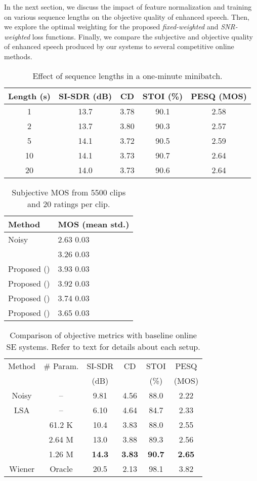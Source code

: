 \documentclass{article}
\begin{document}
In the next section, we discuss the impact of feature normalization and training on various sequence lengths on the objective quality of enhanced speech. Then, we explore the optimal weighting for the proposed \textit{fixed-weighted} and \textit{SNR-weighted} loss functions. Finally, we compare the subjective and objective quality of enhanced speech produced by our systems to several competitive online methods.
\begin{table}[tb]
  \centering
  \caption{Effect of sequence lengths in a one-minute minibatch.}
  \label{tab:seqlen}
  \begin{tabular}{c|c|c|c|c}
    Length (s) &SI-SDR (dB)&CD&STOI (\%)&PESQ (MOS)\\
    \hline
    
    1&13.7&3.78&90.1&2.58 \\
    2&13.7&3.80&90.3&2.57 \\
5&14.1&3.72&90.5&2.59 \\
10&14.1&3.73&90.7&2.64 \\
20&14.0&3.73&90.6&2.64 \\
  \end{tabular}
  \vspace{-4mm}
\end{table}
\begin{table}[tb]
  \centering
  \caption{Subjective MOS from 5500 clips and 20 ratings per clip.}
  \label{tab:sub}
  \begin{tabular}{l|l}
    Method & MOS (mean  std.) \\
    \hline
    Noisy &2.63  0.03 \\
     \cite{Reddy2019} &3.26  0.03 \\
    Proposed ()&3.93  0.03 \\
    Proposed ()&3.92  0.03 \\
    Proposed ()&3.74  0.03 \\
    Proposed ()&3.65  0.03 \\
  \end{tabular}
\end{table}
\begin{table}[tb]
  \centering
  \caption{Comparison of objective metrics with baseline online SE systems. Refer to text for details about each setup.}
  \label{tab:obj}
  \begin{tabular}{c|c|c|c|c|c}
    Method&\# Param.&SI-SDR&CD&STOI&PESQ\\
          &         & (dB) & & (\%) & (MOS)\\
    \hline
    Noisy&--&9.81&4.56&88.0&2.22 \\
    LSA \cite{ephraim1985speech,tashev2009sound}&--&6.10&4.64&84.7&2.33 \\
     \cite{Reddy2019} &61.2 K&10.4&3.83&88.0&2.55 \\
     &2.64 M&13.0&3.88&89.3&2.56 \\
    &1.26 M&\bf{14.3}&\bf{3.83}&\bf{90.7}&\bf{2.65} \\
    Wiener&Oracle&20.5&2.13&98.1&3.82 \\
  \end{tabular}
  \vspace{-4mm}
\end{table}
\end{document}
